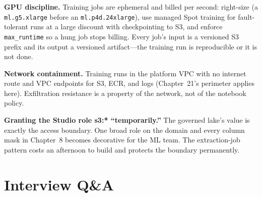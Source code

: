 \textbf{GPU discipline.} Training jobs are ephemeral and billed per second: right-size (a \texttt{ml.g5.xlarge} before an \texttt{ml.p4d.24xlarge}), use managed Spot training for fault-tolerant runs at a large discount with checkpointing to S3, and enforce \texttt{max\_runtime} so a hung job stops billing. Every job's input is a versioned S3 prefix and its output a versioned artifact---the training run is reproducible or it is not done.

\textbf{Network containment.} Training runs in the platform VPC with no internet route and VPC endpoints for S3, ECR, and logs (Chapter~21's perimeter applies here). Exfiltration resistance is a property of the network, not of the notebook policy.

\begin{pitfall}
\textbf{Granting the Studio role s3:* ``temporarily.''} The governed lake's value is exactly the access boundary. One broad role on the domain and every column mask in Chapter~8 becomes decorative for the ML team. The extraction-job pattern costs an afternoon to build and protects the boundary permanently.
\end{pitfall}

\section{Interview Q\&A}
